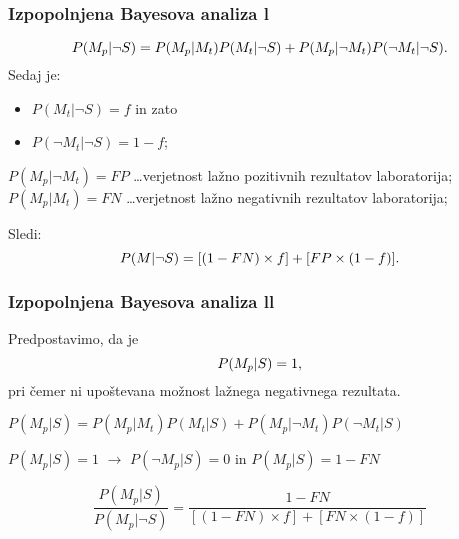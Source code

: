 \documentclass{beamer}
\begin{document}
\begin{frame}
    \frametitle{Izpopolnjena Bayesova analiza l}
    \[
        P(M_p \lvert \neg S) = P(M_p \lvert M_t)P(M_t \lvert \neg S) + P(M_p \lvert \neg M_t)P(\neg M_t \lvert \neg S). \vspace{3mm}
    \]
    Sedaj je:
    \begin{itemize}
        \item $P(M_t \lvert \neg S) = f$ in zato
        \item $P(\neg M_t \lvert \neg S) = 1-f$; \vspace{2mm}
    \end{itemize}  
    \begin{block}{}
        $P(M_p \lvert \neg M_t) = FP$ \dots verjetnost lažno pozitivnih rezultatov laboratorija;\\ \vspace{2mm} 
        $P(M_p \lvert M_t) =  FN$  \dots verjetnost lažno negativnih rezultatov laboratorija;     
    \end{block}
  Sledi: \vspace{2mm}
    \[
        P(M \lvert \neg S) = [(1 - FN) \times f] + [FP \times (1 - f)]. \vspace{3mm}
    \]
\end{frame}
 
\begin{frame}
    \frametitle{Izpopolnjena Bayesova analiza ll}
    Predpostavimo, da je 
    \[
        P(M_p \lvert S) = 1, \vspace{2mm}
    \]
    pri čemer ni upoštevana možnost lažnega negativnega rezultata.  \\ \vspace{2mm} 
    \begin{block}{}
        \centering
        $P(M_p \lvert S) = P(M_p \lvert M_t)P(M_t \lvert S) + P(M_p \lvert \neg M_t)P(\neg M_t \lvert S)$
    \end{block}  \vspace{3mm}
    $P(M_p \lvert S) = 1$ $\rightarrow$ $P(\neg M_p \lvert S) = 0$ in $P(M_p \lvert S) = 1 - FN$
    \begin{block}{}
        \centering
        \[ \frac{P(M_p \lvert S)}{P(M_p \lvert \neg S)} = \frac{1 - FN}{[(1 - FN) \times f] + [FN \times (1 - f)]} \]
    \end{block}
\end{frame}
\end{document}
